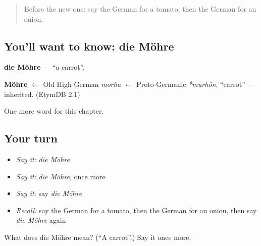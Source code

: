 \label{lesson:GE-C70-moehre}



\begin{quote}
Before the new one: say the German for a tomato, then the German for an onion.
\end{quote}

\subsection*{You'll want to know: die Möhre}
\textbf{die Möhre} — \textquotedblleft{}a carrot\textquotedblright{}.

\begin{cousinweb}
\textbf{Möhre} $\leftarrow$ Old High German \emph{morha} $\leftarrow$ Proto-Germanic \emph{*murhōn}, \textquotedblleft{}carrot\textquotedblright{} — inherited. (EtymDB 2.1)
\end{cousinweb}

\begin{grammarlens}[title={What you've built}]
One more word for this chapter.
\end{grammarlens}

\subsection*{Your turn}
\begin{itemize}
\raggedright
  \item \emph{Say it:} \emph{die Möhre}
  \item \emph{Say it:} \emph{die Möhre}, once more
  \item \emph{Say it:} say \emph{die Möhre}
  \item \emph{Recall:} say the German for a tomato, then the German for an onion, then say \emph{die Möhre} again
\end{itemize}

\begin{tcolorbox}[breakable,colback=teal!4,colframe=teal!35!black,title={Before you move on}]
What does die Möhre mean? (\textquotedblleft{}A carrot\textquotedblright{}.) Say it once more.
\end{tcolorbox}
